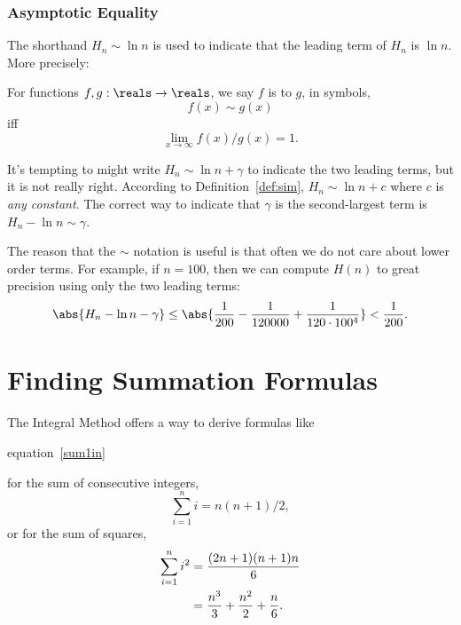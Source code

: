 \subsubsection{Asymptotic Equality}
The shorthand $H_n \sim \ln n$ is used to indicate that the leading
term of $H_n$ is $\ln n$.  More precisely:
\begin{definition}\label{def:sim}
  For functions $f,g: \reals \to \reals$, we say $f$ is  to $g$, in symbols,
\[
f(x) \sim g(x)
\]
iff
\[
\lim_{x \rightarrow \infty} f(x)/g(x) = 1.
\]
\end{definition}

It's tempting to might write $H_n \sim \ln n + \gamma$ to indicate the two
leading terms, but it is not really right.  According to
Definition~\ref{def:sim}, $H_n \sim \ln n + c$ where $c$ is \emph{any
  constant}.  The correct way to indicate that $\gamma$ is the
second-largest term is $H_n - \ln n \sim \gamma$.

The reason that the $\sim$ notation is useful is that often we do not care
about lower order terms.  For example, if $n = 100$, then we can compute
$H(n)$ to great precision using only the two leading terms:
\[
\abs{H_n - \ln n - \gamma} \leq \abs{\frac{1}{200} - \frac{1}{120000} +
\frac{1}{120 \cdot 100^4}} < \frac{1}{200}.
\]
\begin{problems}
\classproblems
{}

\homeworkproblems
{}

\end{problems}

\section{Finding Summation Formulas}\label{findsum_sec}

The Integral Method offers a way to derive formulas like
\begin{editingnotes}equation~\eqref{sum1in}\end{editingnotes}
for the sum of consecutive integers,
\[
\sum_{i=1}^n i = n(n+1)/2,
\]
or for the sum of squares,
\begin{align}
\sum_{i=1}^n i^2 & =  \frac{(2n+1)(n+1)n}{6}\notag \\
                & =  \frac{n^3}{3} + \frac{n^2}{2} + \frac{n}{6}.\label{sumsqcubic}
\end{align}

